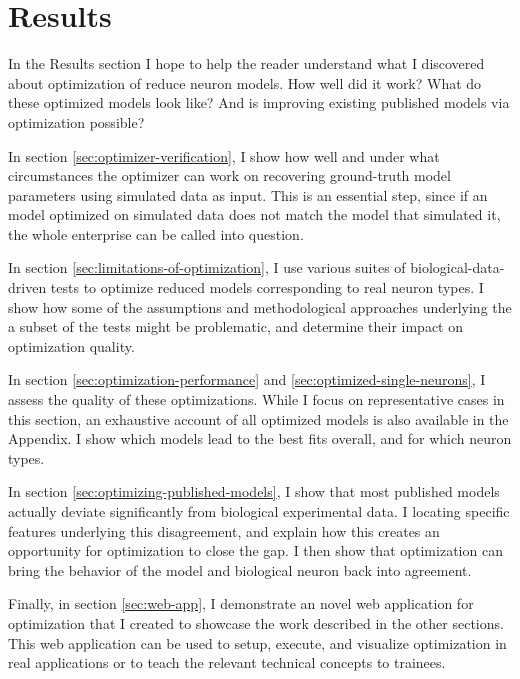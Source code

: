 \chapter{Results}
In the Results section I hope to help the reader understand what I discovered about optimization of reduce neuron models.
How well did it work?
What do these optimized models look like?
And is improving existing published models via optimization possible?

In section \ref{sec:optimizer-verification}, I show how well and under what circumstances the optimizer can work on recovering ground-truth model parameters using simulated data as input.
This is an essential step, since if an model optimized on simulated data does not match the model that simulated it, the whole enterprise can be called into question.

In section \ref{sec:limitations-of-optimization}, I use various suites of biological-data-driven tests to optimize reduced models corresponding to real neuron types.
I show how some of the assumptions and methodological approaches underlying the a subset of the tests might be problematic, and determine their impact on optimization quality. 

In section \ref{sec:optimization-performance} and \ref{sec:optimized-single-neurons}, I assess the quality of these optimizations. 
While I focus on representative cases in this section, an exhaustive account of all optimized models is also available in the Appendix.
I show which models lead to the best fits overall, and for which neuron types.

In section \ref{sec:optimizing-published-models}, I show that most published models actually deviate significantly from biological experimental data.
I locating specific features underlying this disagreement, and explain how this creates an opportunity for optimization to close the gap.
I then show that optimization can bring the behavior of the model and biological neuron back into agreement.

Finally, in section \ref{sec:web-app}, I demonstrate an novel web application for optimization that I created to showcase the work described in the other sections.
This web application can be used to setup, execute, and visualize optimization in real applications or to teach the relevant technical concepts to trainees.


 


 






